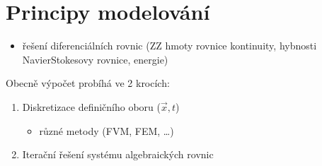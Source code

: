 \documentclass[letterpaper,10pt,czech]{sphinxmanual}
\begin{document}
\section{Principy modelování}
\label{\detokenize{prednaska_23092022:principy-modelovani}}
\sphinxAtStartPar
{}
\begin{itemize}
\item {} 
\sphinxAtStartPar
řešení diferenciálních rovnic (ZZ hmoty \sphinxhyphen{} rovnice kontinuity, hybnosti \sphinxhyphen{} Navier\sphinxhyphen{}Stokesovy rovnice, energie)

\end{itemize}

\sphinxAtStartPar
Obecně výpočet probíhá ve 2 krocích:
\begin{enumerate}
%
\item {} 
\sphinxAtStartPar
Diskretizace definičního oboru (\(\vec{x}, t\))
\begin{itemize}
\item {} 
\sphinxAtStartPar
různé metody (FVM, FEM, …)

\end{itemize}

\item {} 
\sphinxAtStartPar
Iterační řešení systému algebraických rovnic

\end{enumerate}
\end{document}
